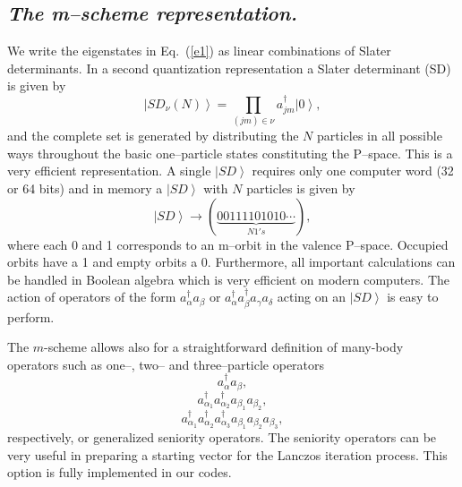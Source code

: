 \documentclass[twoside,12pt]{article}
\newcommand{\be}{\begin{equation}}
\newcommand{\ee}{\end{equation}}
\newcommand{\ket}[1]{\left| #1 \right\rangle}
\begin{document}
\subsection{\it The m--scheme representation.}
%
We write the eigenstates in Eq.~(\ref{e1})  as  linear combinations
of Slater determinants. In a second quantization representation
a Slater determinant (SD) is given by
%
\be
\ket{SD_{\nu}(N)} = \prod_{(jm)\in {\nu}} a_{jm}^{\dagger}\ket{0},
\ee
%
and the complete set is generated by distributing the $N$ particles
in all possible ways throughout the basic one--particle states constituting
the P--space. This is a very efficient
representation. A single $\ket{SD}$ requires only one  computer word
(32 or 64 bits) and  in memory a $\ket{SD}$ with $N$ particles
is given by
%
\be
\ket{SD} \longrightarrow (\underbrace{00111101010 \cdots}_{N 1's}),
\ee
%
where each 0 and 1 corresponds to an m--orbit in the valence
P--space. Occupied orbits  have a 1 and empty orbits a 0.
 Furthermore, all important calculations  can
be handled in Boolean algebra which is very efficient on modern computers.
The action  of operators of the form $a_{\alpha}^{\dagger} a_{\beta}$ or
$a_{\alpha}^{\dagger} a_{\beta}^{\dagger} a_{\gamma} a_{\delta}$
acting on an $\ket{SD}$ is easy to perform.

The $m$-scheme allows also for a straightforward definition of many-body operators 
such as one--, two-- and three--particle operators
     \begin{equation}
     a_{\alpha}^{\dagger} a_{\beta},
     \end{equation}
\begin{equation}
     a_{\alpha_1}^{\dagger}a_{\alpha_2}^{\dagger} a_{\beta_1} a_{\beta_2} ,
\end{equation}
\begin{equation}
     a_{\alpha_1}^{\dagger}a_{\alpha_2}^{\dagger}a_{\alpha_3}^{\dagger}
            a_{\beta_1} a_{\beta_2} a_{\beta_3},
\end{equation}
respectively, 
or 
generalized seniority operators. The seniority operators can be very useful in preparing a
starting vector for the Lanczos iteration process. This option is fully 
implemented in our codes. 
\end{document}
